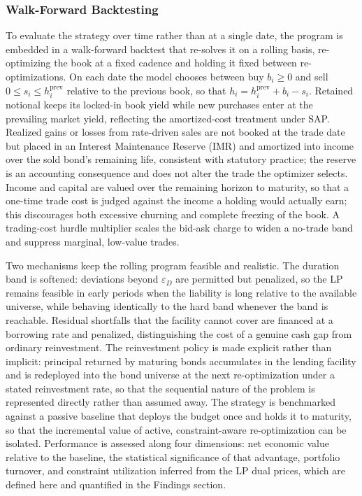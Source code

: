 \documentclass[12pt]{article}
\begin{document}
\subsubsection{Walk-Forward Backtesting}

To evaluate the strategy over time rather than at a single date, the program is embedded in a walk-forward backtest that re-solves it on a rolling basis, re-optimizing the book at a fixed cadence and holding it fixed between re-optimizations. On each date the model chooses between buy $b_i \ge 0$ and sell $0 \le s_i \le h^{\text{prev}}_i$ relative to the previous book, so that $h_i = h^{\text{prev}}_i + b_i - s_i$. Retained notional keeps its locked-in book yield while new purchases enter at the prevailing market yield, reflecting the amortized-cost treatment under SAP. Realized gains or losses from rate-driven sales are not booked at the trade date but placed in an Interest Maintenance Reserve (IMR) and amortized into income over the sold bond's remaining life, consistent with statutory practice; the reserve is an accounting consequence and does not alter the trade the optimizer selects. Income and capital are valued over the remaining horizon to maturity, so that a one-time trade cost is judged against the income a holding would actually earn; this discourages both excessive churning and complete freezing of the book. A trading-cost hurdle multiplier scales the bid-ask charge to widen a no-trade band and suppress marginal, low-value trades.

Two mechanisms keep the rolling program feasible and realistic. The duration band is softened: deviations beyond $\varepsilon_D$ are permitted but penalized, so the LP remains feasible in early periods when the liability is long relative to the available universe, while behaving identically to the hard band whenever the band is reachable. Residual shortfalls that the facility cannot cover are financed at a borrowing rate and penalized, distinguishing the cost of a genuine cash gap from ordinary reinvestment. The reinvestment policy is made explicit rather than implicit: principal returned by maturing bonds accumulates in the lending facility and is redeployed into the bond universe at the next re-optimization under a stated reinvestment rate, so that the sequential nature of the problem is represented directly rather than assumed away. The strategy is benchmarked against a passive baseline that deploys the budget once and holds it to maturity, so that the incremental value of active, constraint-aware re-optimization can be isolated. Performance is assessed along four dimensions: net economic value relative to the baseline, the statistical significance of that advantage, portfolio turnover, and constraint utilization inferred from the LP dual prices, which are defined here and quantified in the Findings section.
\end{document}

